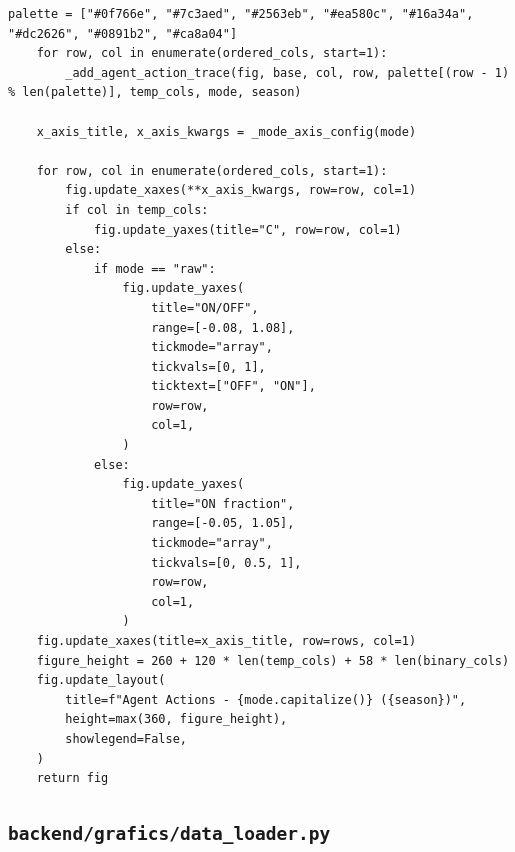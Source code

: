 \documentclass[10pt,a4paper]{article}
\begin{document}
\begin{lstlisting}[style=studioPython,caption={backend/grafics/control.py},label={lst:backend-grafics-control-py}]
    palette = ["#0f766e", "#7c3aed", "#2563eb", "#ea580c", "#16a34a", "#dc2626", "#0891b2", "#ca8a04"]
    for row, col in enumerate(ordered_cols, start=1):
        _add_agent_action_trace(fig, base, col, row, palette[(row - 1) % len(palette)], temp_cols, mode, season)

    x_axis_title, x_axis_kwargs = _mode_axis_config(mode)

    for row, col in enumerate(ordered_cols, start=1):
        fig.update_xaxes(**x_axis_kwargs, row=row, col=1)
        if col in temp_cols:
            fig.update_yaxes(title="C", row=row, col=1)
        else:
            if mode == "raw":
                fig.update_yaxes(
                    title="ON/OFF",
                    range=[-0.08, 1.08],
                    tickmode="array",
                    tickvals=[0, 1],
                    ticktext=["OFF", "ON"],
                    row=row,
                    col=1,
                )
            else:
                fig.update_yaxes(
                    title="ON fraction",
                    range=[-0.05, 1.05],
                    tickmode="array",
                    tickvals=[0, 0.5, 1],
                    row=row,
                    col=1,
                )
    fig.update_xaxes(title=x_axis_title, row=rows, col=1)
    figure_height = 260 + 120 * len(temp_cols) + 58 * len(binary_cols)
    fig.update_layout(
        title=f"Agent Actions - {mode.capitalize()} ({season})",
        height=max(360, figure_height),
        showlegend=False,
    )
    return fig
\end{lstlisting}


\subsection{\texorpdfstring{\texttt{backend/grafics/data\_loader.py}}{backend/grafics/data\_loader.py}}
\end{document}
